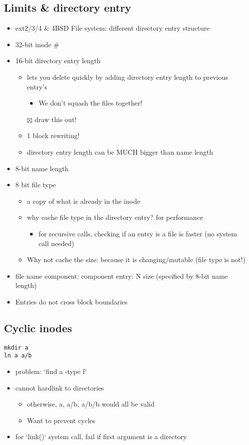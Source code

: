 \documentclass[11pt]{article}
\begin{document}
\subsection{Limits \& directory entry}
\label{sec:org4456ba9}
\begin{itemize}
\item ext2/3/4 \& 4BSD File system: different directory entry structure
\item 32-bit inode \#
\item 16-bit directory entry length
\begin{itemize}
\item lets you delete quickly by adding directory entry length to previous entry's
\begin{itemize}
\item We don't squash the files together!
\end{itemize}
\item[{$\boxtimes$}] draw this out!
\item 1 block rewriting!
\item directory entry length can be MUCH bigger than name length
\end{itemize}
\item 8-bit name length
\item 8 bit file type
\begin{itemize}
\item a copy of what is already in the inode
\item why cache file type in the directory entry? for performance
\begin{itemize}
\item for recursive calls, checking if an entry is a file is faster (no system call needed)
\end{itemize}
\item Why not cache the size: because it is changing/mutable (file type is not!)
\end{itemize}
\item file name component: component entry: N size (specified by 8-bit name length)
\item Entries do not cross block boundaries
\end{itemize}
\subsection{Cyclic inodes}
\label{sec:org07feb90}
\begin{verbatim}
mkdir a
ln a a/b

\end{verbatim}
\begin{itemize}
\item problem: `find a -type f`
\item cannot hardlink to directories
\begin{itemize}
\item otherwise, a, a/b, a/b/b would all be valid
\item Want to prevent cycles
\end{itemize}
\item for `link()` system call, fail if first argument is a directory
\end{itemize}
\end{document}
